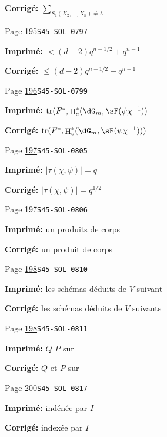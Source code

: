 \documentclass[oneside]{book}
\DeclareMathOperator{\h}{H}
\DeclareMathOperator{\tr}{tr}
\theoremstyle{sga-source}
\theoremstyle{sga-source-dash}
\theoremstyle{sga-source-dotdash}
\theoremstyle{sga-source-number-note-dash}
\theoremstyle{sga-source-note-number-dotdash}
\theoremstyle{sga-source-example-dotdash}
\theoremstyle{sga-source-inline-number}
\theoremstyle{sga-source-bare-number}
\theoremstyle{sga-source}
\begin{document}
\begin{description}
\par\noindent\textbf{Corrigé:} \(\sum_{S_1(X_2,\dots,X_n)\ne\lambda}\)
\smallskip
\item[\hypertarget{apparatus:FR-0175}{175}] Page \hyperlink{printpage:fr:195}{195}\quad\texttt{S45-SOL-0797}
\par\noindent\textbf{Imprimé:} \(< (d-2) q^{n-1/2} + q^{n-1}\)
\par\noindent\textbf{Corrigé:} \(\leqslant (d-2) q^{n-1/2} + q^{n-1}\)
\smallskip
\item[\hypertarget{apparatus:FR-0176}{176}] Page \hyperlink{printpage:fr:196}{196}\quad\texttt{S45-SOL-0799}
\par\noindent\textbf{Imprimé:} \(\tr(F^\ast,\h_c^\ast(\dG_m,\sF(\psi \chi^{-1}))\)
\par\noindent\textbf{Corrigé:} \(\tr(F^\ast,\h_c^\ast(\dG_m,\sF(\psi \chi^{-1})))\)
\smallskip
\item[\hypertarget{apparatus:FR-0177}{177}] Page \hyperlink{printpage:fr:197}{197}\quad\texttt{S45-SOL-0805}
\par\noindent\textbf{Imprimé:} \(|\tau(\chi,\psi)|=q\)
\par\noindent\textbf{Corrigé:} \(|\tau(\chi,\psi)|=q^{1/2}\)
\smallskip
\item[\hypertarget{apparatus:FR-0178}{178}] Page \hyperlink{printpage:fr:197}{197}\quad\texttt{S45-SOL-0806}
\par\noindent\textbf{Imprimé:} un produits de corps
\par\noindent\textbf{Corrigé:} un produit de corps
\smallskip
\item[\hypertarget{apparatus:FR-0179}{179}] Page \hyperlink{printpage:fr:198}{198}\quad\texttt{S45-SOL-0810}
\par\noindent\textbf{Imprimé:} les schémas déduits de $V$ suivant
\par\noindent\textbf{Corrigé:} les schémas déduits de $V$ suivants
\smallskip
\item[\hypertarget{apparatus:FR-0180}{180}] Page \hyperlink{printpage:fr:198}{198}\quad\texttt{S45-SOL-0811}
\par\noindent\textbf{Imprimé:} $Q$ $P$ sur
\par\noindent\textbf{Corrigé:} $Q$ et $P$ sur
\smallskip
\item[\hypertarget{apparatus:FR-0181}{181}] Page \hyperlink{printpage:fr:200}{200}\quad\texttt{S45-SOL-0817}
\par\noindent\textbf{Imprimé:} indénée par $I$
\par\noindent\textbf{Corrigé:} indexée par $I$

\end{description}
\end{document}
